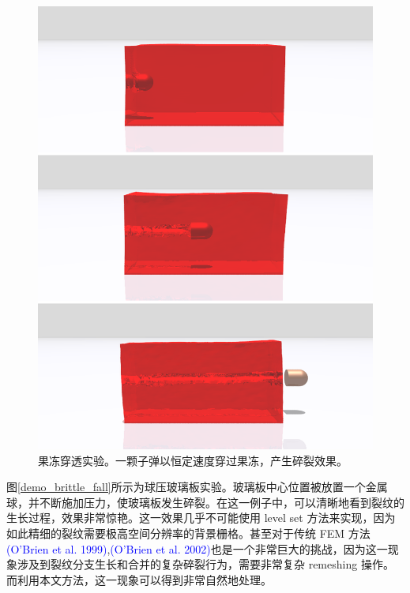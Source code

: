 \begin{figure}[htbp]
\begin{minipage}[t]{0.45\textwidth}
  \includegraphics[width=0.9\linewidth]{chap/image/demo_jello}
  \caption{\label{demo_jello}
           果冻穿透实验。一颗子弹以恒定速度穿过果冻，产生碎裂效果。
          }

\end{minipage}
\end{figure}

图\ref{demo_brittle_fall}所示为球压玻璃板实验。玻璃板中心位置被放置一个金属球，并不断施加压力，使玻璃板发生碎裂。在这一例子中，可以清晰地看到裂纹的生长过程，效果非常惊艳。这一效果几乎不可能使用 level set 方法来实现，因为如此精细的裂纹需要极高空间分辨率的背景栅格。甚至对于传统 FEM 方法\textcolor{blue}{(O'Brien et al. 1999)\supercite{OBrien1999}},\textcolor{blue}{(O'Brien et al. 2002)\supercite{OBrien2002}}也是一个非常巨大的挑战，因为这一现象涉及到裂纹分支生长和合并的复杂碎裂行为，需要非常复杂 remeshing 操作。而利用本文方法，这一现象可以得到非常自然地处理。

